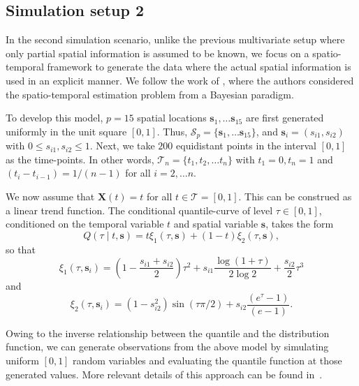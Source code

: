 \documentclass[aos]{imsart}
\theoremstyle{plain}
\theoremstyle{remark}
\newcommand{\Scal}{\mathcal{S}}
\newcommand{\Tcal}{\mathcal{T}}
\newcommand{\bb}[1]{\boldsymbol{#1}}
\begin{document}
\subsection{Simulation setup 2}

In the second simulation scenario, unlike the previous multivariate setup where only partial spatial information is assumed to be known, we focus on a spatio-temporal framework to generate the data where the actual spatial information is used in an explicit manner. We follow the work of \cite{das2017analyzing}, where the authors considered the spatio-temporal estimation problem from a Bayesian paradigm.  

To develop this model, $p=15$ spatial locations $\bb{s}_1, \dots \bb{s}_{15}$ are first generated uniformly in the unit square $[0, 1]$. Thus, $\Scal_p = \{ \bb{s}_1, \dots \bb{s}_{15}\}$, and $\bb{s}_i = (s_{i1}, s_{i2})$ with $0 \leqslant s_{i1}, s_{i2} \leqslant 1$. Next, we take $200$ equidistant points in the interval $[0, 1]$ as the time-points. In other words, $\Tcal_n = \{ t_1, t_2, \dots t_n \}$ with $t_1 = 0, t_n = 1$ and $(t_i - t_{i-1}) = 1/(n-1)$ for all $i = 2, \dots n$.
    
We now assume that $\bb{X}(t) = t$ for all $t \in \Tcal = [0, 1]$. This can be construed as a linear trend function. The conditional quantile-curve of level $\tau \in [0, 1]$, conditioned on the temporal variable $t$ and spatial variable $\bb{s}$, takes the form
\begin{equation}\label{eqn:quantile-curve-setup2}
    Q(\tau \mid t, \bb{s}) = t \xi_1(\tau, \bb{s}) + (1-t) \xi_2(\tau, \bb{s}),
\end{equation}
so that
\begin{equation*}
    \xi_1(\tau, \bb{s}_i) = \left( 1 - \dfrac{s_{i1} + s_{i2}}{2} \right)\tau^2 + s_{i1} \dfrac{\log(1+\tau)}{2\log 2} + \dfrac{s_{i2}}{2}\tau^3
\end{equation*}
and
\begin{equation*}
    \xi_2(\tau, \bb{s}_i) = (1 - s_{i2}^2)\sin\left(\tau \pi /2 \right) + s_{i2} \dfrac{(e^{\tau} - 1)}{(e - 1)}.
\end{equation*}


Owing to the inverse relationship between the quantile and the distribution function, we can generate observations from the above model by simulating uniform $[0, 1]$ random variables and evaluating the quantile function at those generated values. More relevant details of this approach can be found in~\cite{das2017analyzing}.
\end{document}
